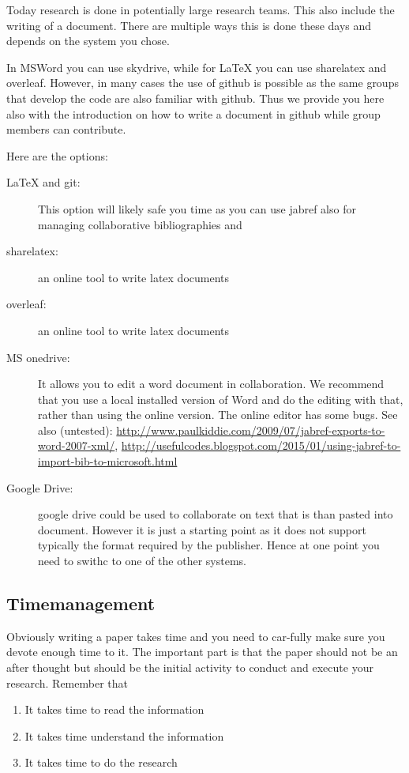 Today research is done in potentially large research teams. This also
include the writing of a document. There are multiple ways this is done
these days and depends on the system you chose.

In MSWord you can use skydrive, while for LaTeX you can use sharelatex
and overleaf. However, in many cases the use of github is possible as
the same groups that develop the code are also familiar with github.
Thus we provide you here also with the introduction on how to write a
document in github while group members can contribute.

Here are the options:

\begin{description}

\item [LaTeX and git:] This option will likely safe you time as you can use
  jabref also for managing collaborative bibliographies and
\item [sharelatex:] an online tool to write latex documents
\item [overleaf:] an online tool to write latex documents
\item [MS onedrive:] It allows you to edit a word document in collaboration.
  We recommend that you use a local installed version of Word and do the
  editing with that, rather than using the online version. The online
  editor has some bugs. See also (untested):
  \url{http://www.paulkiddie.com/2009/07/jabref-exports-to-word-2007-xml/},
  \url{http://usefulcodes.blogspot.com/2015/01/using-jabref-to-import-bib-to-microsoft.html}
\item [Google Drive:] google drive could be used to collaborate on text that
  is than pasted into document. However it is just a starting point as
  it does not support typically the format required by the publisher.
  Hence at one point you need to swithc to one of the other systems.
\end{description}

\subsection{Timemanagement}\label{timemanagement}

Obviously writing a paper takes time and you need to car-fully make sure
you devote enough time to it. The important part is that the paper
should not be an after thought but should be the initial activity to
conduct and execute your research. Remember that

\begin{enumerate}

\item  It takes time to read the information
\item  It takes time understand the information
\item  It takes time to do the research

\end{enumerate}

